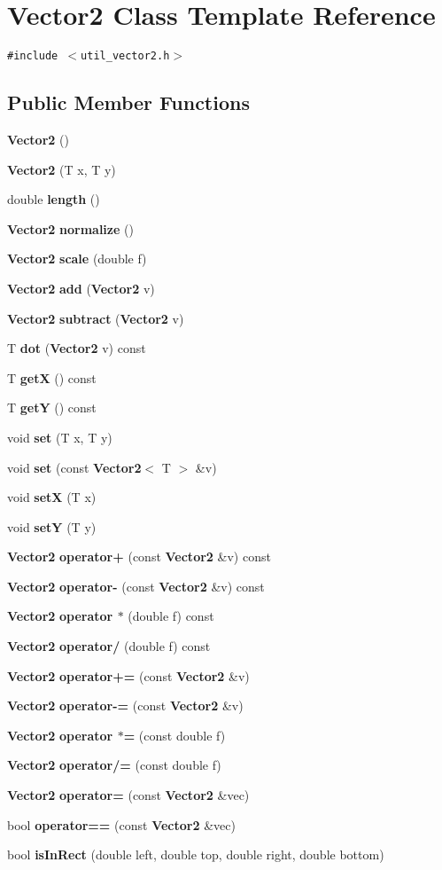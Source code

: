 \section{Vector2 Class Template Reference}
\label{classEngine_1_1Vector2}
{\tt \#include $<$util\_\-vector2.h$>$}

\subsection*{Public Member Functions}
\begin{CompactItemize}
\item 
{\bf Vector2} ()
\item 
{\bf Vector2} (T x, T y)
\item 
double {\bf length} ()
\item 
{\bf Vector2} {\bf normalize} ()
\item 
{\bf Vector2} {\bf scale} (double f)
\item 
{\bf Vector2} {\bf add} ({\bf Vector2} v)
\item 
{\bf Vector2} {\bf subtract} ({\bf Vector2} v)
\item 
T {\bf dot} ({\bf Vector2} v) const 
\item 
T {\bf getX} () const 
\item 
T {\bf getY} () const 
\item 
void {\bf set} (T x, T y)
\item 
void \textbf{set} (const {\bf Vector2}$<$ T $>$ \&v)\label{classEngine_1_1Vector2_85c25fb388f7e0abe34e82a226c61744}

\item 
void {\bf setX} (T x)
\item 
void {\bf setY} (T y)
\item 
{\bf Vector2} {\bf operator+} (const {\bf Vector2} \&v) const 
\item 
{\bf Vector2} {\bf operator-} (const {\bf Vector2} \&v) const 
\item 
{\bf Vector2} {\bf operator $\ast$} (double f) const 
\item 
{\bf Vector2} {\bf operator/} (double f) const 
\item 
{\bf Vector2} {\bf operator+=} (const {\bf Vector2} \&v)
\item 
{\bf Vector2} {\bf operator-=} (const {\bf Vector2} \&v)
\item 
{\bf Vector2} {\bf operator $\ast$=} (const double f)
\item 
{\bf Vector2} {\bf operator/=} (const double f)
\item 
{\bf Vector2} {\bf operator=} (const {\bf Vector2} \&vec)
\item 
bool {\bf operator==} (const {\bf Vector2} \&vec)
\item 
bool {\bf isInRect} (double left, double top, double right, double bottom)
\end{CompactItemize}


